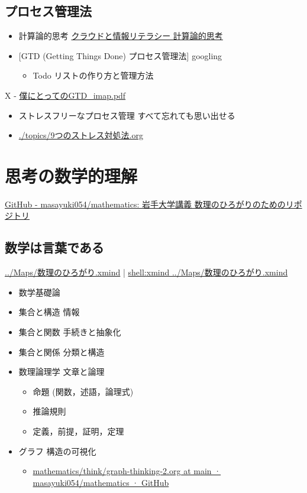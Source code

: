 \documentclass[dvipdfmx,11pat]{jarticle}
\begin{document}
\subsection{プロセス管理法}
\label{sec:orgc231a15}
\begin{itemize}
\item 計算論的思考 \href{https://masayuki054.github.io/cloud\_and\_information\_literacy/docs/computational\_thinking.html}{クラウドと情報リテラシー 計算論的思考}
\item {[}GTD (Getting Things Done) プロセス管理法] googling 
\begin{itemize}
\item Todo リストの作り方と管理方法
\end{itemize}
\end{itemize}
X  - \href{https://masayuki054.github.io/cloud\_and\_information\_literacy/i\_maps/\%E5\%83\%95\%E3\%81\%AB\%E3\%81\%A8\%E3\%81\%A3\%E3\%81\%A6\%E3\%81\%AEGTD\_imap.pdf}{僕にとってのGTD\_imap.pdf}
\begin{itemize}
\item ストレスフリーなプロセス管理 すべて忘れても思い出せる
\end{itemize}
\begin{itemize}
\item \url{./topics/9つのストレス対処法.org}
\end{itemize}
\section{思考の数学的理解}
\label{sec:org9649964}
\href{https://github.com/masayuki054/mathematics/tree/main}{GitHub - masayuki054/mathematics: 岩手大学講義 数理のひろがりのためのリポジトリ}
\subsection{数学は言葉である}
\label{sec:orgf6a1e4a}
\url{../Maps/数理のひろがり.xmind} | \url{shell:xmind ../Maps/数理のひろがり.xmind}
\begin{itemize}
\item 数学基礎論
\item 集合と構造 情報
\item 集合と関数 手続きと抽象化
\item 集合と関係 分類と構造
\item 数理論理学 文章と論理
\begin{itemize}
\item 命題 (関数，述語，論理式)
\item 推論規則
\item 定義，前提，証明，定理
\end{itemize}
\item グラフ 構造の可視化
\begin{itemize}
\item \href{https://github.com/masayuki054/mathematics/blob/main/think/graph-thinking-2.org}{mathematics/think/graph-thinking-2.org at main · masayuki054/mathematics · GitHub}
\end{itemize}
\end{itemize}
\end{document}
